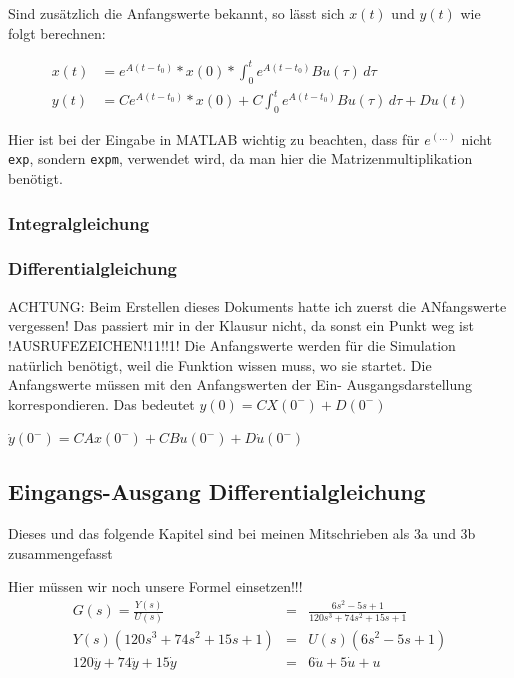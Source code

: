 Sind zusätzlich die Anfangswerte bekannt, so lässt sich $x(t)$ und $y(t)$ wie folgt berechnen:

\begin{align*}
    x(t) & = e^{A(t-t_0)} * x(0) * \int_{0}^{t} e^{A(t-t_0)}Bu(\tau) \,d\tau \nonumber \\
    y(t) & = Ce^{A(t-t_0)} * x(0) + C \int_{0}^{t} e^{A(t-t_0)}Bu(\tau) \,d\tau + Du(t)
\end{align*}

Hier ist bei der Eingabe in MATLAB wichtig zu beachten, dass für $e^{(\ldots)}$ nicht \texttt{exp}, sondern \texttt{expm}, verwendet wird, da man hier die Matrizenmultiplikation benötigt.

\subsubsection{Integralgleichung}
\subsubsection{Differentialgleichung}

ACHTUNG: Beim Erstellen dieses Dokuments hatte ich zuerst die ANfangswerte vergessen! Das passiert mir in der Klausur nicht, da sonst ein Punkt weg ist !AUSRUFEZEICHEN!11!!1!
Die Anfangswerte werden für die Simulation natürlich benötigt, weil die Funktion wissen muss, wo sie startet.
Die Anfangswerte müssen mit den Anfangswerten der Ein-  Ausgangsdarstellung korrespondieren. 
Das bedeutet $y(0) = CX(0^-) + D(0^-)$

$ \dot y(0^-) = CAx(0^-) + CBu(0^-) + D \dot u (0^-)$

\subsection{Eingangs-Ausgang Differentialgleichung}

Dieses und das folgende Kapitel sind bei meinen Mitschrieben als 3a und 3b zusammengefasst

Hier müssen wir noch unsere Formel einsetzen!!!
\begin{eqnarray*}
    G(s) =\frac{Y(s)}{U(s)} &=& \frac{6s^2 - 5s + 1}{120s^3 + 74s^2 + 15s +1} \\
    Y(s)(120s^3 + 74s^2 + 15s +1) &=& U(s) (6s^2 - 5s + 1) \\
    120 \dddot y + 74 \ddot y + 15 \dot y &=& 6 \ddot u + 5 \dot u + u
\end{eqnarray*}

